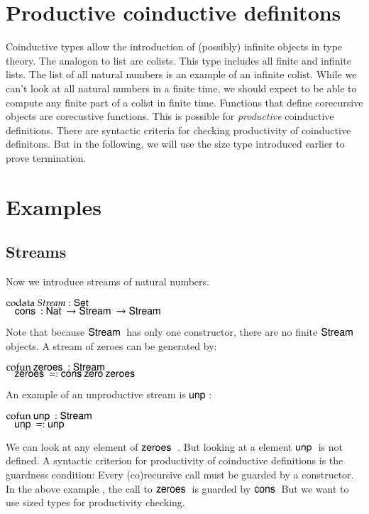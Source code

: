 \section{Productive coinductive definitons}
Coinductive types allow the introduction of (possibly) infinite objects in type theory.
The analogon to list are colists. This type includes all finite and infinite lists.
The list of all natural numbers is an example of an infinite colist.
While we can't look at all natural numbers in a finite time, we should expect to be able to
compute any finite part of a colist in finite time.
Functions that define corecursive objects are corecustive functions.
This is possible for \emph{productive} coinductive definitions.
There are syntactic criteria for checking productivity of coinductive definitons.
But in the following, we will use the size type introduced earlier to prove termination.

\section{Examples}

\subsection{Streams}
Now we introduce streams of natural numbers.
\begin{bsp}
$\mathrm{codata}\: Stream : \mathsf{Set} $ \\
$\hspace*{3mm} \mathsf{cons}\: : \mathsf{Nat}\: \rightarrow \mathsf{Stream}\: \rightarrow \mathsf{Stream}\: $
\end{bsp}
Note that because $\mathsf{Stream}\:$ has only one constructor, there are no finite $\mathsf{Stream}\:$ objects.
A stream of zeroes can be generated by:
\begin{bsp}
$\mathrm{cofun}\: \mathsf{zeroes}\:: \mathsf{Stream}\: $ \\
$\hspace*{3mm} \mathsf{zeroes}\: = : \mathsf{cons}\: \mathsf{zero}\: \mathsf{zeroes}\:$
\end{bsp}

An example of an unproductive stream is $\mathsf{unp}\:$:
\begin{bsp}
$\mathrm{cofun}\: \mathsf{unp}\: : \mathsf{Stream}\: $ \\
$\hspace*{3mm} \mathsf{unp}\: = : \mathsf{unp}\:$
\end{bsp}
We can look at any element of $\mathsf{zeroes}\:$ .
But looking at a element $\mathsf{unp}\:$ is not defined. 
A syntactic criterion for productivity of coinductive definitions is the guardness condition:
Every (co)recursive call must be guarded by a constructor.
In the above example , the call to $\mathsf{zeroes}\:$ is guarded by $\mathsf{cons}\:$
But we want to use sized types for productivity checking.

